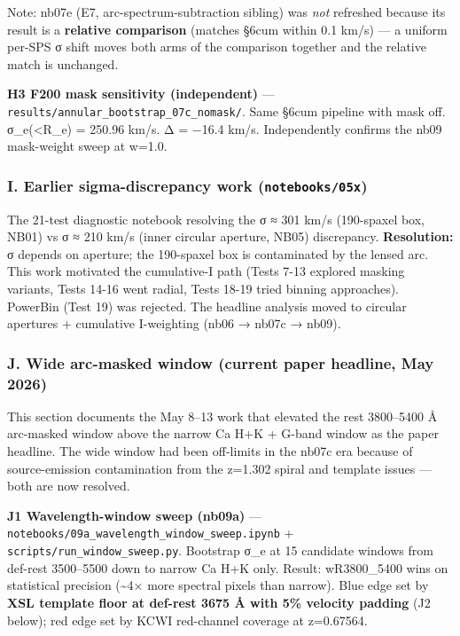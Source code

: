 \documentclass[
  10pt,
]{article}
\begin{document}
Note: nb07e (E7, arc-spectrum-subtraction sibling) was \emph{not} refreshed because its result is a \textbf{relative comparison} (matches §6cum within 0.1 km/s) --- a uniform per-SPS σ shift moves
both arms of the comparison together and the relative match is unchanged.

\textbf{H3 F200 mask sensitivity (independent)} --- \texttt{results/annular\_bootstrap\_07c\_nomask/}. Same §6cum pipeline with mask off. σ\_e(\textless R\_e) = 250.96 km/s. Δ = −16.4 km/s.
Independently confirms the nb09 mask-weight sweep at w=1.0.

\hypertarget{i.-earlier-sigma-discrepancy-work-notebooks05x}{%
\subsubsection{\texorpdfstring{I. Earlier sigma-discrepancy work (\texttt{notebooks/05x})}{I. Earlier sigma-discrepancy work (notebooks/05x)}}\label{i.-earlier-sigma-discrepancy-work-notebooks05x}}

The 21-test diagnostic notebook resolving the σ ≈ 301 km/s (190-spaxel box, NB01) vs σ ≈ 210 km/s (inner circular aperture, NB05) discrepancy. \textbf{Resolution:} σ depends on aperture; the
190-spaxel box is contaminated by the lensed arc. This work motivated the cumulative-I path (Tests 7-13 explored masking variants, Tests 14-16 went radial, Tests 18-19 tried binning approaches).
PowerBin (Test 19) was rejected. The headline analysis moved to circular apertures + cumulative I-weighting (nb06 → nb07c → nb09).

\hypertarget{j.-wide-arc-masked-window-current-paper-headline-may-2026}{%
\subsubsection{J. Wide arc-masked window (current paper headline, May 2026)}\label{j.-wide-arc-masked-window-current-paper-headline-may-2026}}

This section documents the May 8--13 work that elevated the rest 3800--5400 Å arc-masked window above the narrow Ca H+K + G-band window as the paper headline. The wide window had been off-limits in
the nb07c era because of source-emission contamination from the z=1.302 spiral and template issues --- both are now resolved.

\textbf{J1 Wavelength-window sweep (nb09a)} --- \texttt{notebooks/09a\_wavelength\_window\_sweep.ipynb} + \texttt{scripts/run\_window\_sweep.py}. Bootstrap σ\_e at 15 candidate windows from def-rest
3500--5500 down to narrow Ca H+K only. Result: wR3800\_5400 wins on statistical precision (\textasciitilde4× more spectral pixels than narrow). Blue edge set by \textbf{XSL template floor at def-rest
3675 Å with 5\% velocity padding} (J2 below); red edge set by KCWI red-channel coverage at z=0.67564.
\end{document}
